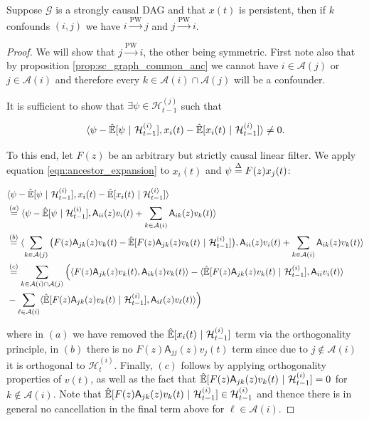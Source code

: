\documentclass[12pt]{article}
\def\pwgc{\overset{\text{PW}}{\rightarrow}}  %
\def\gcg{\mathcal{G}}  %
\def\A{\mathsf{A}}  %
\def\H{\mathcal{H}}  %
\newcommand{\linE}[2]{\hat{\E}[#1\ |\ #2]}  %
\newcommand{\anc}[1]{\mathcal{A}(#1)}  %
\begin{document}
\begin{proposition}
  \label{prop:persistence_converse}
  Suppose $\gcg$ is a strongly causal DAG and that $x(t)$ is persistent, then if $k$
  confounds $(i, j)$ we have $i \pwgc j$ and $j \pwgc i$.
\end{proposition}
\begin{proof}
  We will show that $j \pwgc i$, the other being symmetric.  First
  note also that by proposition \ref{prop:sc_graph_common_anc} we
  cannot have $i \in \anc{j}$ or $j \in \anc{i}$ and therefore every
  $k \in \anc{i}\cap\anc{j}$ will be a confounder.

  It is sufficient to show that $\exists \psi \in \H_{t - 1}^{(j)}$
  such that

  \begin{equation*}
    \inner{\psi - \linE{\psi}{\H_{t - 1}^{(i)}}}{x_i(t) - \linE{x_i(t)}{\H_{t - 1}^{(i)}}} \ne 0.
  \end{equation*}

  To this end, let $F(z)$ be an arbitrary but strictly causal linear
  filter.  We apply equation \eqref{eqn:ancestor_expansion} to
  $x_i(t)$ and $\psi \overset{\Delta}{=} F(z)x_j(t)$:

  \begin{align*}
    &\inner{\psi - \linE{\psi}{\H_{t - 1}^{(i)}}}{x_i(t) - \linE{x_i(t)}{\H_{t - 1}^{(i)}}}\\
    &\overset{(a)}{=} \inner{\psi - \linE{\psi}{\H_{t - 1}^{(i)}}}{\A_{ii}(z)v_i(t) + \sum_{k \in \anc{i}}\A_{ik}(z)v_k(t)}\\
    &\overset{(b)}{=} \inner{\sum_{k \in \anc{j}}\big(F(z)\A_{jk}(z)v_k(t) - \linE{F(z)\A_{jk}(z)v_k(t)}{\H_{t - 1}^{(i)}}\big)}{\A_{ii}(z)v_i(t) + \sum_{k \in \anc{i}}\A_{ik}(z)v_k(t)}\\
    &\overset{(c)}{=} \sum_{k \in \anc{i}\cap\anc{j}}\Big(\inner{F(z)\A_{jk}(z)v_k(t)}{\A_{ik}(z)v_k(t)} - \inner{\linE{F(z)\A_{jk}(z)v_k(t)}{\H_{t - 1}^{(i)}}}{\A_{ii}v_i(t)}\\
    &- \sum_{\ell \in \anc{i}}\inner{\linE{F(z)\A_{jk}(z)v_k(t)}{\H_{t - 1}^{(i)}}}{\A_{i\ell}(z)v_\ell(t)}\Big)
  \end{align*}

  where in $(a)$ we have removed the $\linE{x_i(t)}{\H_{t - 1}^{(i)}}$
  term via the orthogonality principle, in $(b)$ there is no
  $F(z)\A_{jj}(z)v_j(t)$ term since due to $j \not\in \anc{i}$ it is
  orthogonal to $\H_t^{(i)}$.  Finally, $(c)$ follows by applying
  orthogonality properties of $v(t)$, as well as the fact that
  $\linE{F(z)\A_{jk}(z)v_k(t)}{\H_{t - 1}^{(i)}} = 0$ for
  $k \not \in \anc{i}$.  Note that
  $\linE{F(z)\A_{jk}(z)v_k(t)}{\H_{t - 1}^{(i)}} \in \H_{t - 1}^{(i)}$
  and thence there is in general no cancellation in the final term
  above for $\ell \in \anc{i}$.


\end{proof}
\end{document}
